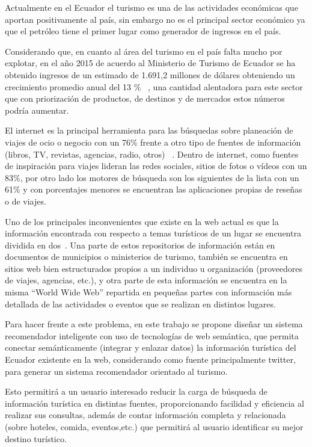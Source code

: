\documentclass[lnbip,sechang,a4paper]{svmultln}
\begin{document}
Actualmente en el Ecuador el turismo es una de las actividades económicas que aportan positivamente al país, sin embargo no es el principal sector económico ya que el petróleo tiene el primer lugar como generador de ingresos en el país.

Considerando que, en cuanto al área del turismo en el país falta mucho por explotar, en el año 2015 de acuerdo al Ministerio de Turismo de Ecuador se ha obtenido ingresos de un estimado de 1.691,2 millones de dólares  obteniendo un crecimiento promedio anual del 13 \% ~\cite{puno}, una cantidad alentadora para este sector que con  priorización de productos, de destinos y de mercados estos números podría aumentar.

El internet es la principal herramienta para las búsquedas sobre planeación de viajes de ocio o negocio con un 76\% frente a otro tipo de fuentes de información (libros, TV, revistas, agencias, radio, otros) ~\cite{pdos}. Dentro de internet, como fuentes de inspiración para viajes lideran las redes sociales, sitios de fotos o vídeos con un 83\%, por otro lado los motores de búsqueda son los siguientes de la lista con un 61\% y con porcentajes menores se encuentran las aplicaciones propias de reseñas o de viajes.

Uno de los principales inconvenientes que existe en la web actual es que la información encontrada con respecto a temas turísticos de un lugar se encuentra dividida en dos~\cite{seis}. Una parte de estos repositorios de información están en documentos de municipios o ministerios de turismo, también  se encuentra en sitios web bien estructurados propios a un individuo u organización (proveedores de viajes, agencias, etc.), y otra parte de esta información se encuentra en la misma “World Wide Web” repartida en pequeñas partes con información más detallada de las actividades o  eventos que se realizan en distintos lugares.

Para hacer frente a este problema, en este trabajo se propone diseñar un sistema recomendador inteligente con uso de  tecnologías de web semántica, que permita conectar semánticamente (integrar y enlazar datos) la información turística del Ecuador existente en la web, considerando como fuente principalmente twitter, para generar un sistema recomendador orientado al turismo.  

Esto permitirá a un usuario interesado reducir la carga de búsqueda de información turística en distintas fuentes, proporcionando facilidad y eficiencia al realizar sus consultas, además de contar información completa y relacionada (sobre hoteles, comida, eventos,etc.) que permitirá al usuario identificar su mejor destino turístico.
\end{document}
